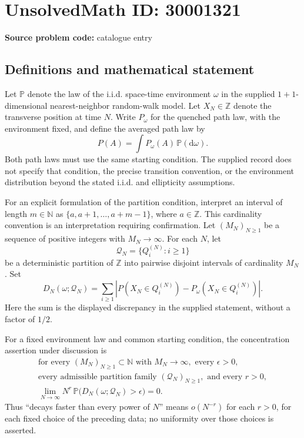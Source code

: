 \documentclass[11pt]{article}
\newcommand{\N}{\mathbb{N}}
\newcommand{\Z}{\mathbb{Z}}
\begin{document}
\section*{UnsolvedMath ID: 30001321}
\textbf{Source problem code:} catalogue entry
\subsection{Definitions and mathematical statement}
Let \(\mathbb P\) denote the law of the i.i.d. space-time environment \(\omega\) in the supplied \(1+1\)-dimensional nearest-neighbor random-walk model. Let \(X_N\in\Z\) denote the transverse position at time \(N\). Write \(P_\omega\) for the quenched path law, with the environment fixed, and define the averaged path law by
\[
P(A)=\int P_\omega(A)\,\mathbb P(\mathrm d\omega).
\]
Both path laws must use the same starting condition. The supplied record does not specify that condition, the precise transition convention, or the environment distribution beyond the stated i.i.d. and ellipticity assumptions.

For an explicit formulation of the partition condition, interpret an interval of length \(m\in\N\) as \(\{a,a+1,\ldots,a+m-1\}\), where \(a\in\Z\). This cardinality convention is an interpretation requiring confirmation. Let \((M_N)_{N\geq1}\) be a sequence of positive integers with \(M_N\to\infty\). For each \(N\), let
\[
\mathcal Q_N=\{Q_i^{(N)}:i\geq1\}
\]
be a deterministic partition of \(\Z\) into pairwise disjoint intervals of cardinality \(M_N\). Set
\[
D_N(\omega;\mathcal Q_N)
=\sum_{i\geq1}\left|
P(X_N\in Q_i^{(N)})-P_\omega(X_N\in Q_i^{(N)})
\right|.
\]
Here the sum is the displayed discrepancy in the supplied statement, without a factor of \(1/2\).

For a fixed environment law and common starting condition, the concentration assertion under discussion is
\[
\begin{gathered}
\text{for every }(M_N)_{N\geq1}\subset\N\text{ with }M_N\to\infty,
\text{ every }\epsilon>0,\\
\text{every admissible partition family }(\mathcal Q_N)_{N\geq1},
\text{ and every }r>0,\\
\lim_{N\to\infty}N^r\,
\mathbb P\bigl(D_N(\omega;\mathcal Q_N)>\epsilon\bigr)=0.
\end{gathered}
\tag{C}
\]
Thus ``decays faster than every power of \(N\)'' means \(o(N^{-r})\) for each \(r>0\), for each fixed choice of the preceding data; no uniformity over those choices is asserted.
\end{document}
